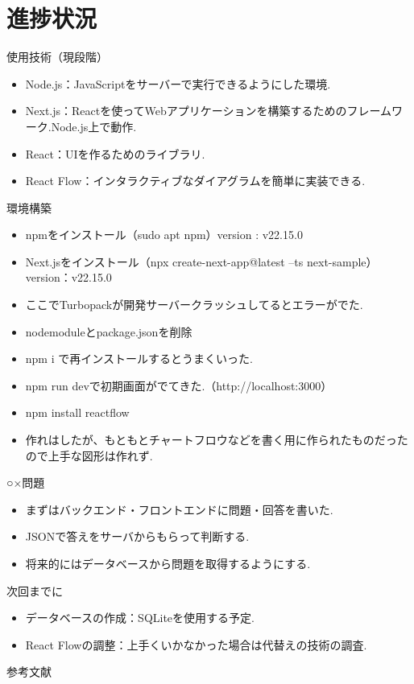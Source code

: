 \documentclass[aspectratio=169]{beamer}
\begin{document}
\section{進捗状況}
\begin{frame}{使用技術（現段階）}
    \begin{itemize}
        \setlength{\itemsep}{1em}
        \item Node.js：JavaScriptをサーバーで実行できるようにした環境.
        \item Next.js：Reactを使ってWebアプリケーションを構築するためのフレームワーク.Node.js上で動作.
        \item React：UIを作るためのライブラリ.
        \item React Flow：インタラクティブなダイアグラムを簡単に実装できる.
    \end{itemize}
    
\end{frame}
\begin{frame}{環境構築}
    \begin{itemize}
        \setlength{\itemsep}{1em}
        \item npmをインストール（sudo apt npm）version : v22.15.0
        \item Next.jsをインストール（npx create-next-app@latest --ts next-sample）version：v22.15.0
        \item ここでTurbopackが開発サーバークラッシュしてるとエラーがでた.
        \item \rightarrow nodemoduleとpackage.jsonを削除
        \item npm i で再インストールするとうまくいった.
        \item npm run devで初期画面がでてきた.（http://localhost:3000）
        \item npm install reactflow
        \item 作れはしたが、もともとチャートフロウなどを書く用に作られたものだったので上手な図形は作れず.
    \end{itemize}    
\end{frame}

\begin{frame}{○×問題}
    \begin{itemize}
        \setlength{\itemsep}{1em}
        \item まずはバックエンド・フロントエンドに問題・回答を書いた.
        \item JSONで答えをサーバからもらって判断する.
        \item 将来的にはデータベースから問題を取得するようにする.
    \end{itemize}
\end{frame}

\begin{frame}{次回までに}
    \begin{itemize}
        \setlength{\itemsep}{1em}
        \item データベースの作成：SQLiteを使用する予定.
        \item React Flowの調整：上手くいかなかった場合は代替えの技術の調査.
    \end{itemize}
\end{frame}

\begin{frame}[allowframebreaks]{参考文献}
    \small
        
\end{frame}
\end{document}

